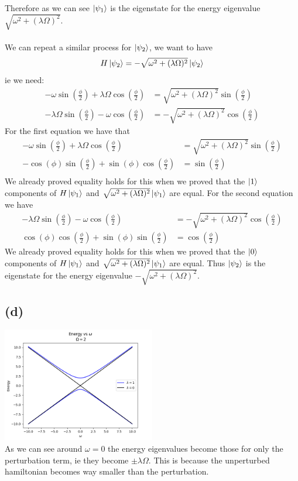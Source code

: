 \documentclass[11pt]{article}
\begin{document}
Therefore as we can see $\ket{\psi_1}$ is the eigenstate 
for the energy eigenvalue $\sqrt{\omega^2+(\lambda\Omega)^2}$.\\\\
We can repeat a similar process for $\ket{\psi_2}$, we want to have 
$$
H\ket{\psi_2} = -\sqrt{\omega^2+(\lambda\Omega)^2}\ket{\psi_2}
$$
ie we need:
\begin{align*}
    -\omega\sin\left(\frac{\phi}{2}\right)+\lambda\Omega\cos\left(
        \frac{\phi}{2}\right) &= \sqrt{\omega^2+(\lambda\Omega)^2}\sin\left(\frac{\phi}{2}\right)\\
    -\lambda\Omega\sin\left(\frac{\phi}{2}\right)-\omega\cos\left(\frac{\phi}{2}\right)
    &= -\sqrt{\omega^2+(\lambda\Omega)^2}\cos\left(\frac{\phi}{2}\right)
\end{align*}
For the first equation we have that 
\begin{align*}
    -\omega\sin\left(\frac{\phi}{2}\right)+\lambda\Omega\cos\left(
        \frac{\phi}{2}\right) &= \sqrt{\omega^2+(\lambda\Omega)^2}\sin\left(\frac{\phi}{2}\right)\\
    -\cos(\phi)\sin\left(\frac{\phi}{2}\right)+\sin(\phi)\cos\left(\frac{\phi}{2}\right) &= \sin\left(\frac{\phi}{2}\right)\\
\end{align*}
We already proved equality holds for this when we proved that the $\ket{1}$ components 
of $H\ket{\psi_1}$ and $\sqrt{\omega^2+(\lambda\Omega)^2}\ket{\psi_1}$ are equal. For the second equation we have 
\begin{align*}
    -\lambda\Omega\sin\left(\frac{\phi}{2}\right)-\omega\cos\left(\frac{\phi}{2}\right)
    &= -\sqrt{\omega^2+(\lambda\Omega)^2}\cos\left(\frac{\phi}{2}\right)\\
    \cos(\phi)\cos\left(\frac{\phi}{2}\right)+
\sin(\phi)\sin\left(\frac{\phi}{2}\right) &= \cos\left(\frac{\phi}{2}\right)
\end{align*}
We already proved equality holds for this when we proved that the $\ket{0}$ components 
of $H\ket{\psi_1}$ and $\sqrt{\omega^2+(\lambda\Omega)^2}\ket{\psi_1}$ are equal. Thus $\ket{\psi_2}$ is the eigenstate 
for the energy eigenvalue $-\sqrt{\omega^2+(\lambda\Omega)^2}$.
\subsection*{(d)}
\includegraphics*[width=0.5\textwidth]{fig2.png}\\
As we can see around $\omega=0$ the energy eigenvalues become 
those for only the perturbation term, ie they become $\pm\lambda\Omega$.
This is because the unperturbed hamiltonian becomes way smaller than the perturbation.
\end{document}
